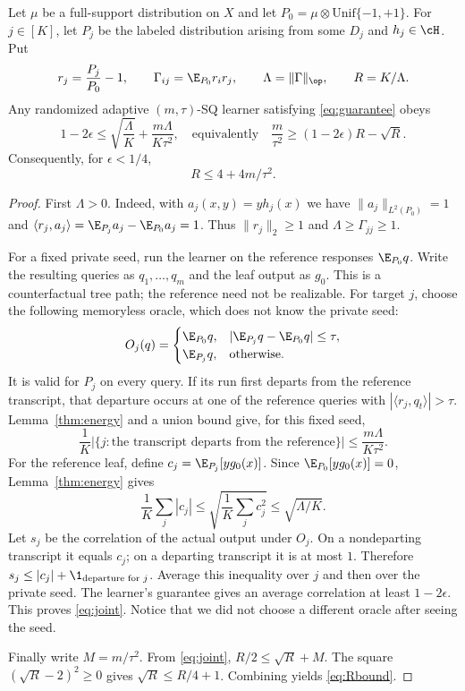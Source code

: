 \begin{theorem}\label{thm:barrier}
Let $\mu$ be a full-support distribution on $X$ and let $P_0=\mu\otimes\mathrm{Unif}\{-1,+1\}$. For $j\in[K]$, let $P_j$ be the labeled distribution arising from some $D_j$ and $h_j\in\cH$. Put
\[
 r_j=\frac{P_j}{P_0}-1,\qquad
 \Gamma_{ij}=\E_{P_0}r_i r_j,\qquad
 \Lambda=\|\Gamma\|_\op,\qquad R=K/\Lambda.
\]
Any randomized adaptive $(m,\tau)$-SQ learner satisfying \eqref{eq:guarantee} obeys
\begin{equation}\label{eq:joint}
 1-2\epsilon\leq\sqrt{\frac\Lambda K}+
 \frac{m\Lambda}{K\tau^2},
 \quad\text{equivalently}\quad
 \frac m{\tau^2}\geq(1-2\epsilon)R-\sqrt R.
\end{equation}
Consequently, for $\epsilon<1/4$,
\begin{equation}\label{eq:Rbound}
 R\leq4+4m/\tau^2.
\end{equation}
\end{theorem}
\begin{proof}
First $\Lambda>0$. Indeed, with $a_j(x,y)=y h_j(x)$ we have $\|a_j\|_{L^2(P_0)}=1$ and
$\langle r_j,a_j\rangle=\E_{P_j}a_j-\E_{P_0}a_j=1$. Thus $\|r_j\|_2\geq1$ and $\Lambda\geq\Gamma_{jj}\geq1$.

For a fixed private seed, run the learner on the reference responses $\E_{P_0}q$. Write the resulting queries as $q_1,\ldots,q_m$ and the leaf output as $g_0$. This is a counterfactual tree path; the reference need not be realizable. For target $j$, choose the following memoryless oracle, which does not know the private seed:
\[
 O_j(q)=
 \begin{cases}
 \E_{P_0}q,&|\E_{P_j}q-\E_{P_0}q|\leq\tau,\\
 \E_{P_j}q,&\text{otherwise}.
 \end{cases}
\]
It is valid for $P_j$ on every query. If its run first departs from the reference transcript, that departure occurs at one of the reference queries with $|\langle r_j,q_t\rangle|>\tau$. Lemma~\ref{thm:energy} and a union bound give, for this fixed seed,
\[
 \frac1K\bigl|\{j:\text{the transcript departs from the reference}\}\bigr|
 \leq\frac{m\Lambda}{K\tau^2}.
\]
For the reference leaf, define $c_j=\E_{P_j}[y g_0(x)]$. Since $\E_{P_0}[y g_0(x)]=0$, Lemma~\ref{thm:energy} gives
\[
 \frac1K\sum_j|c_j|\leq
 \sqrt{\frac1K\sum_jc_j^2}\leq\sqrt{\Lambda/K}.
\]
Let $s_j$ be the correlation of the actual output under $O_j$. On a nondeparting transcript it equals $c_j$; on a departing transcript it is at most $1$. Therefore
$s_j\leq|c_j|+\1_{\text{departure for }j}$.
Average this inequality over $j$ and then over the private seed. The learner's guarantee gives an average correlation at least $1-2\epsilon$. This proves \eqref{eq:joint}. Notice that we did not choose a different oracle after seeing the seed.

Finally write $M=m/\tau^2$. From \eqref{eq:joint}, $R/2\leq\sqrt R+M$. The square $(\sqrt R-2)^2\geq0$ gives $\sqrt R\leq R/4+1$. Combining yields \eqref{eq:Rbound}.
\end{proof}

